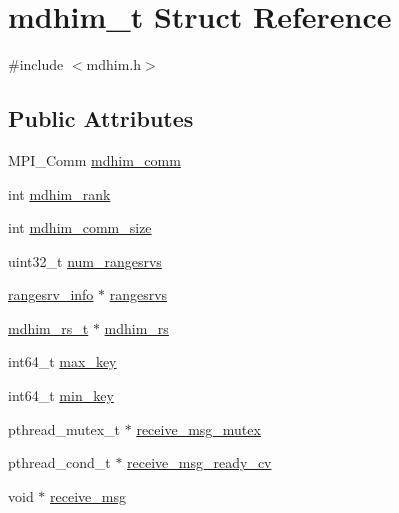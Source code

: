 \hypertarget{structmdhim__t}{\section{mdhim\-\_\-t Struct Reference}
\label{d8/dbc/structmdhim__t}
}


{\ttfamily \#include $<$mdhim.\-h$>$}

\subsection*{Public Attributes}
\begin{DoxyCompactItemize}
\item 
M\-P\-I\-\_\-\-Comm \hyperlink{structmdhim__t_a9772a2d123d58e9cd3e4514b860aee97}{mdhim\-\_\-comm}
\item 
int \hyperlink{structmdhim__t_a501753bb85acfd853c73d3c888714b20}{mdhim\-\_\-rank}
\item 
int \hyperlink{structmdhim__t_ab4bf1dd32ae146382cade22a706c1380}{mdhim\-\_\-comm\-\_\-size}
\item 
uint32\-\_\-t \hyperlink{structmdhim__t_a41b224b41799585edf8a8b2b2f4626cc}{num\-\_\-rangesrvs}
\item 
\hyperlink{structrangesrv__info}{rangesrv\-\_\-info} $\ast$ \hyperlink{structmdhim__t_ae05a450ac4f312ae4bdb9c1ea52e53e0}{rangesrvs}
\item 
\hyperlink{structmdhim__rs__t}{mdhim\-\_\-rs\-\_\-t} $\ast$ \hyperlink{structmdhim__t_ae555c224ade4584fcc3895f8ea19a302}{mdhim\-\_\-rs}
\item 
int64\-\_\-t \hyperlink{structmdhim__t_ad619b3f5abb7fadda7011309865a4a62}{max\-\_\-key}
\item 
int64\-\_\-t \hyperlink{structmdhim__t_af005677e9912642ebe431f5037824d97}{min\-\_\-key}
\item 
pthread\-\_\-mutex\-\_\-t $\ast$ \hyperlink{structmdhim__t_ae5abe6f33b5951a30f582fda42292706}{receive\-\_\-msg\-\_\-mutex}
\item 
pthread\-\_\-cond\-\_\-t $\ast$ \hyperlink{structmdhim__t_ac4a79eb13f34377840b924c41802f0fb}{receive\-\_\-msg\-\_\-ready\-\_\-cv}
\item 
void $\ast$ \hyperlink{structmdhim__t_abc3233b7d61111d19bb7ac0222a918fc}{receive\-\_\-msg}
\end{DoxyCompactItemize}


